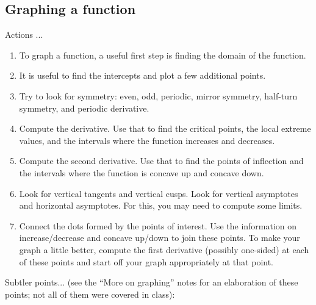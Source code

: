 \documentclass[10pt]{amsart}
\begin{document}
\subsection{Graphing a function}

Actions ...

\begin{enumerate}
\item To graph a function, a useful first step is finding the domain
  of the function.
\item It is useful to find the intercepts and plot a few additional points.
\item Try to look for symmetry: even, odd, periodic, mirror symmetry,
  half-turn symmetry, and periodic derivative.
\item Compute the derivative. Use that to find the critical points,
  the local extreme values, and the intervals where the function
  increases and decreases.
\item Compute the second derivative. Use that to find the points of
  inflection and the intervals where the function is concave up and
  concave down.
\item Look for vertical tangents and vertical cusps. Look for vertical
  asymptotes and horizontal asymptotes. For this, you may need to
  compute some limits.
\item Connect the dots formed by the points of interest. Use the
  information on increase/decrease and concave up/down to join these
  points. To make your graph a little better, compute the first
  derivative (possibly one-sided) at each of these points and start
  off your graph appropriately at that point.
\end{enumerate}

Subtler points... (see the ``More on graphing'' notes for an
elaboration of these points; not all of them were covered in class):
\end{document}

